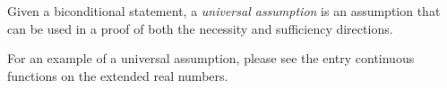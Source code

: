\documentclass[12pt]{article}
\begin{document}
Given a biconditional statement, a \emph{universal assumption} is an assumption that can be used in a proof of both the necessity and sufficiency directions.

For an example of a universal assumption, please see the entry continuous functions on the extended real numbers.
\end{document}
